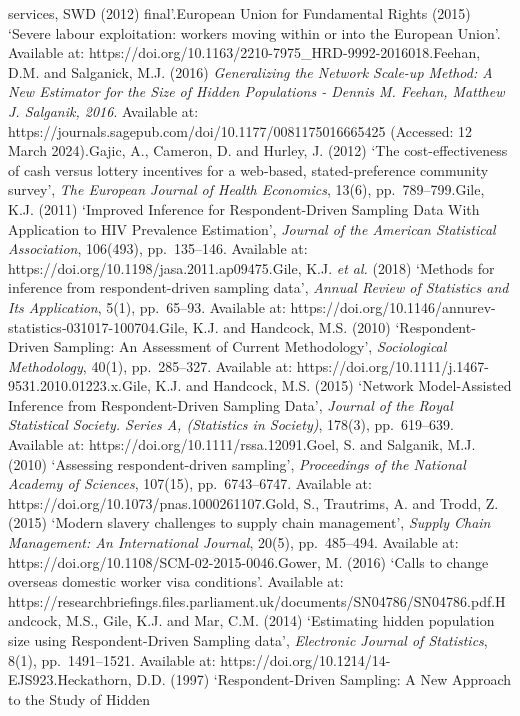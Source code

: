 \documentclass[
  12pt,
  letterpaper,
  DIV=11,
  numbers=noendperiod]{scrartcl}
\begin{document}
{{services, SWD (2012) final'.European Union for Fundamental Rights (2015)
`Severe labour exploitation: workers moving within or into the European
Union'. Available at:
https://doi.org/10.1163/2210-7975\_HRD-9992-2016018.Feehan, D.M. and
Salganick, M.J. (2016) \emph{Generalizing the Network Scale-up Method: A
New Estimator for the Size of Hidden Populations - Dennis M. Feehan,
Matthew J. Salganik, 2016}. Available at:
https://journals.sagepub.com/doi/10.1177/0081175016665425 (Accessed: 12
March 2024).Gajic, A., Cameron, D. and Hurley, J. (2012) `The
cost-effectiveness of cash versus lottery incentives for a web-based,
stated-preference community survey', \emph{The European Journal of
Health Economics}, 13(6), pp.~789--799.Gile, K.J. (2011) `Improved
Inference for Respondent-Driven Sampling Data With Application to HIV
Prevalence Estimation', \emph{Journal of the American Statistical
Association}, 106(493), pp.~135--146. Available at:
https://doi.org/10.1198/jasa.2011.ap09475.Gile, K.J. \emph{et al.}
(2018) `Methods for inference from respondent-driven sampling data',
\emph{Annual Review of Statistics and Its Application}, 5(1),
pp.~65--93. Available at:
https://doi.org/10.1146/annurev-statistics-031017-100704.Gile, K.J. and
Handcock, M.S. (2010) `Respondent-Driven Sampling: An Assessment of
Current Methodology', \emph{Sociological Methodology}, 40(1),
pp.~285--327. Available at:
https://doi.org/10.1111/j.1467-9531.2010.01223.x.Gile, K.J. and
Handcock, M.S. (2015) `Network Model-Assisted Inference from
Respondent-Driven Sampling Data', \emph{Journal of the Royal Statistical
Society. Series A, (Statistics in Society)}, 178(3), pp.~619--639.
Available at: https://doi.org/10.1111/rssa.12091.Goel, S. and Salganik,
M.J. (2010) `Assessing respondent-driven sampling', \emph{Proceedings of
the National Academy of Sciences}, 107(15), pp.~6743--6747. Available
at: https://doi.org/10.1073/pnas.1000261107.Gold, S., Trautrims, A. and
Trodd, Z. (2015) `Modern slavery challenges to supply chain management',
\emph{Supply Chain Management: An International Journal}, 20(5),
pp.~485--494. Available at:
https://doi.org/10.1108/SCM-02-2015-0046.Gower, M. (2016) `Calls to
change overseas domestic worker visa conditions'. Available at:
https://researchbriefings.files.parliament.uk/documents/SN04786/SN04786.pdf.Handcock,
M.S., Gile, K.J. and Mar, C.M. (2014) `Estimating hidden population size
using Respondent-Driven Sampling data', \emph{Electronic Journal of
Statistics}, 8(1), pp.~1491--1521. Available at:
https://doi.org/10.1214/14-EJS923.Heckathorn, D.D. (1997)
`Respondent-Driven Sampling: A New Approach to the Study of Hidden
}}
\end{document}
